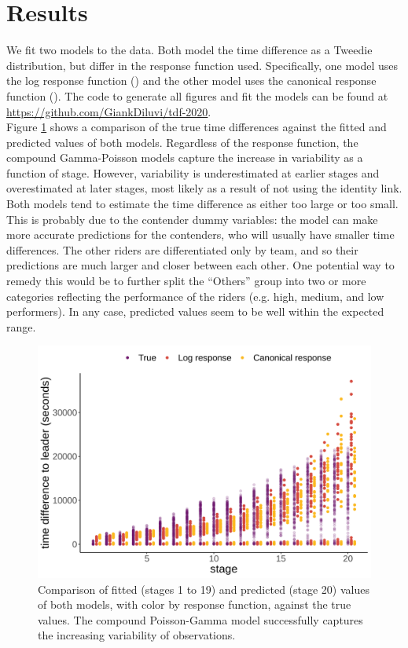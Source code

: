 \documentclass[aos,preprint]{imsart}
\begin{document}
\section{Results} \label{sec:results}


We fit two models to the data. Both model the time difference as a Tweedie distribution, but differ in the response function used. Specifically, one model uses the log response function () and the other model uses the canonical response function (). The code to generate all figures and fit the models can be found at \url{https://github.com/GiankDiluvi/tdf-2020}. \\


Figure \ref{fig:fitted_predicted} shows a comparison of the true time differences against the fitted and predicted values of both models. Regardless of the response function, the compound Gamma-Poisson models capture the increase in variability as a function of stage. However, variability is underestimated at earlier stages and overestimated at later stages, most likely as a result of not using the identity link. Both models tend to estimate the time difference as either too large or too small. This is probably due to the contender dummy variables: the model can make more accurate predictions for the contenders, who will usually have smaller time differences. The other riders are differentiated only by team, and so their predictions are much larger and closer between each other. One potential way to remedy this would be to further split the ``Others'' group into two or more categories reflecting the performance of the riders (e.g. high, medium, and low performers). In any case, predicted values seem to be well within the expected range. \\



\begin{figure}[h]
  \centering
  \includegraphics[scale=0.65]{fig/fitted_predicted_comparison.png}
  \caption{Comparison of fitted (stages 1 to 19) and predicted (stage 20) values of both models, with color by response function, against the true values. The compound Poisson-Gamma model successfully captures the increasing variability of observations.}
  \label{fig:fitted_predicted}
\end{figure}
\end{document}

